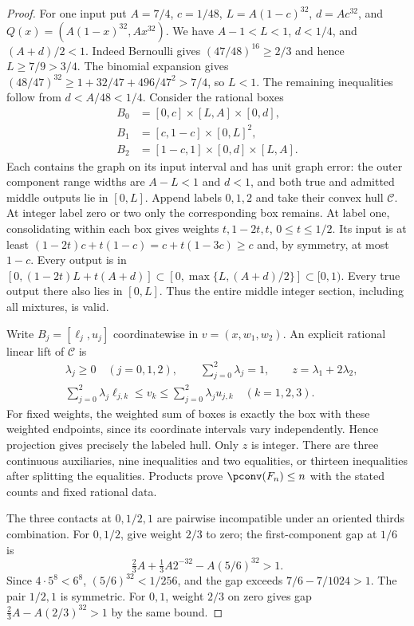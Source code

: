 \begin{proof}
For one input put $A=7/4$, $c=1/48$, $L=A(1-c)^{32}$,
$d=Ac^{32}$, and $Q(x)=(A(1-x)^{32},Ax^{32})$.
We have $A-1<L<1$, $d<1/4$, and $(A+d)/2<1$.
Indeed Bernoulli gives $(47/48)^{16}\ge2/3$ and hence
$L\ge7/9>3/4$. The binomial expansion gives
$(48/47)^{32}\ge1+32/47+496/47^2>7/4$, so $L<1$.
The remaining inequalities follow from $d<A/48<1/4$.
Consider the rational boxes
\begin{align*}
 B_0&=[0,c]\times[L,A]\times[0,d],\\
 B_1&=[c,1-c]\times[0,L]^2,\\
 B_2&=[1-c,1]\times[0,d]\times[L,A].
\end{align*}
Each contains the graph on its input interval and has unit graph error:
the outer component range widths are $A-L<1$ and $d<1$, and both
true and admitted middle outputs lie in $[0,L]$.
Append labels $0,1,2$ and take their convex hull $\mathcal C$.
At integer label zero or two only the corresponding box remains.
At label one, consolidating within each box gives weights
$t,1-2t,t$, $0\le t\le1/2$. Its input is at least
$(1-2t)c+t(1-c)=c+t(1-3c)\ge c$ and, by symmetry, at most $1-c$.
Every output is in
$[0,(1-2t)L+t(A+d)]\subset[0,\max\{L,(A+d)/2\}]\subset[0,1)$.
Every true output there also lies in $[0,L]$. Thus the entire middle
integer section, including all mixtures, is valid.

Write $B_j=[\ell_j,u_j]$ coordinatewise in $v=(x,w_1,w_2)$.
An explicit rational linear lift of $\mathcal C$ is
\begin{align*}
 &\lambda_j\ge0\quad(j=0,1,2),\qquad
   \sum_{j=0}^2\lambda_j=1,\qquad z=\lambda_1+2\lambda_2,\\
 &\sum_{j=0}^2\lambda_j\ell_{j,k}\le v_k
   \le\sum_{j=0}^2\lambda_j u_{j,k}\quad(k=1,2,3).
\end{align*}
For fixed weights, the weighted sum of boxes is exactly the box with
these weighted endpoints, since its coordinate intervals vary independently.
Hence projection gives precisely the labeled hull. Only $z$ is integer.
There are three continuous auxiliaries, nine inequalities and two equalities,
or thirteen inequalities after splitting the equalities. Products prove
$\pconv(F_n)\le n$ with the stated counts and fixed rational data.

The three contacts at $0,1/2,1$ are pairwise incompatible under an
oriented thirds combination. For $0,1/2$, give weight $2/3$ to zero;
the first-component gap at $1/6$ is
\[
 \tfrac23A+\tfrac13A2^{-32}-A(5/6)^{32}>1.
\]
Since $4\cdot5^8<6^8$, $(5/6)^{32}<1/256$, and the gap exceeds
$7/6-7/1024>1$. The pair $1/2,1$ is symmetric. For $0,1$, weight
$2/3$ on zero gives gap $\tfrac23A-A(2/3)^{32}>1$ by the same bound.


\end{proof}

